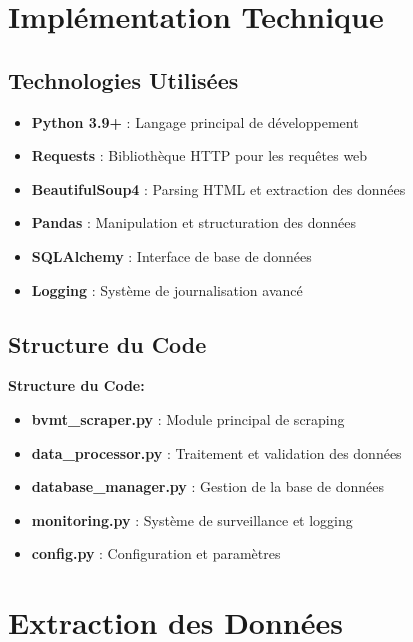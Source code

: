\section{Implémentation Technique}

\subsection{Technologies Utilisées}

\begin{itemize}
    \item \textbf{Python 3.9+} : Langage principal de développement
    \item \textbf{Requests} : Bibliothèque HTTP pour les requêtes web
    \item \textbf{BeautifulSoup4} : Parsing HTML et extraction des données
    \item \textbf{Pandas} : Manipulation et structuration des données
    \item \textbf{SQLAlchemy} : Interface de base de données
    \item \textbf{Logging} : Système de journalisation avancé
\end{itemize}

\subsection{Structure du Code}


\textbf{Structure du Code:}
\begin{itemize}
    \item \textbf{bvmt\_scraper.py} : Module principal de scraping
    \item \textbf{data\_processor.py} : Traitement et validation des données
    \item \textbf{database\_manager.py} : Gestion de la base de données
    \item \textbf{monitoring.py} : Système de surveillance et logging
    \item \textbf{config.py} : Configuration et paramètres
\end{itemize}

\section{Extraction des Données}

